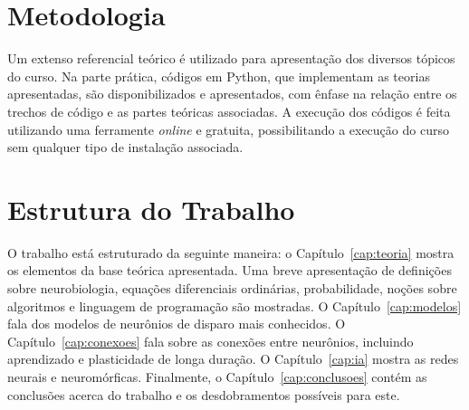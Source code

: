 \section{Metodologia}
Um extenso referencial teórico é utilizado para apresentação dos diversos tópicos do curso. Na parte prática, códigos em Python, que implementam as teorias apresentadas, são disponibilizados e apresentados, com ênfase na relação entre os trechos de código e as partes teóricas associadas. A execução dos códigos é feita utilizando uma ferramente \textit{online} e gratuita, possibilitando a execução do curso sem qualquer tipo de instalação associada.

\section{Estrutura do Trabalho}
O trabalho está estruturado da seguinte maneira: o Capítulo~\ref{cap:teoria} mostra os elementos da base teórica apresentada. Uma breve apresentação de definições sobre neurobiologia, equações diferenciais ordinárias, probabilidade, noções sobre algoritmos e linguagem de programação são mostradas. O Capítulo~\ref{cap:modelos} fala dos modelos de neurônios de disparo mais conhecidos. O Capítulo~\ref{cap:conexoes} fala sobre as conexões entre neurônios, incluindo aprendizado e plasticidade de longa duração. O Capítulo~\ref{cap:ia} mostra as redes neurais e neuromórficas.
Finalmente, o Capítulo~\ref{cap:conclusoes} contém as conclusões acerca do trabalho e os desdobramentos possíveis para este.
